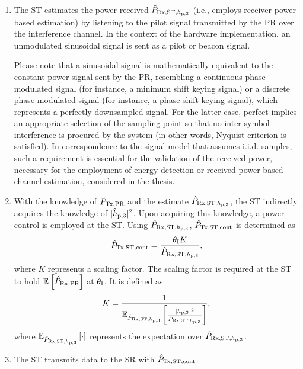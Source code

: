 \begin{enumerate}
	\item The ST estimates the power received $\hat{P}_{\text{Rx,ST,$h_{\text{p,3}}$}}$ (i.e., employs receiver power-based estimation) by listening to the pilot signal transmitted by the PR over the interference channel. In the context of the hardware implementation, an unmodulated sinusoidal signal is sent as a pilot or beacon signal. 

Please note that a sinusoidal signal is mathematically equivalent to the constant power signal sent by the PR, resembling a continuous phase modulated signal (for instance, a minimum shift keying signal) or a discrete phase modulated signal (for instance, a phase shift keying signal), which represents a perfectly downsampled signal. For the latter case, perfect implies an appropriate selection of the sampling point so that no inter symbol interference is procured by the system (in other words, Nyquist criterion is satisfied). In correspondence to the signal model that assumes i.i.d. samples, such a requirement is essential for the validation of the received power, necessary for the employment of energy detection or received power-based channel estimation, considered in the thesis.
	\item With the knowledge of $P_{\text{Tx,PR}}$ and the estimate $\hat{P}_{\text{Rx,ST,$h_{\text{p,3}}$}}$, the ST indirectly acquires the knowledge of $|\hat{h}_{\text{p,3}}|^2$. 
	Upon acquiring this knowledge, a power control is employed at the ST. Using $\hat{P}_{\text{Rx,ST,$h_{\text{p,3}}$}}$, $\hat{P}_{\text{Tx,ST,cont}}$ is determined as 
\begin{align}
\hat{P}_{\text{Tx,ST,cont}} = \frac{\theta_{\text{I}} K}{\hat{P}_{\text{Rx,ST,$h_{\text{p,3}}$}}}, \label{eq_HVD:preg} 
\end{align}
where $K$ represents a scaling factor. The scaling factor is required at the ST to hold ${\mathbb E}_{}\left[ \hat{P}_{\text{Rx,PR}} \right]$ at $\theta_{\text{I}}$. It is defined as
\begin{align}
K = \frac{1}{ {\mathbb E}_{\hat{P}_{\text{Rx,ST,$h_{\text{p,3}}$}}}\left[ \frac{|h_{\text{p,3}}|^2}{\hat{P}_{\text{Rx,ST,$h_{\text{p,3}}$}}} \right]}, \label{eq_HVD:sca} 
\end{align}
where ${\mathbb E}_{\hat{P}_{\text{Rx,ST,$h_{\text{p,3}}$}}}\left[ \cdot \right]$ represents the expectation over $\hat{P}_{\text{Rx,ST,$h_{\text{p,3}}$}}$.
	\item The ST transmits data to the SR with $\hat{P}_{\text{Tx,ST,cont}}$. 

\end{enumerate}
